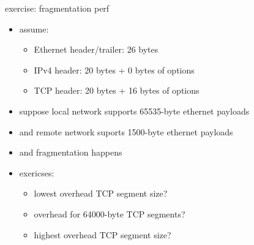 \begin{frame}{exercise: fragmentation perf}
    \begin{itemize}
    \item assume:
    \begin{itemize}
        \item Ethernet header/trailer: 26 bytes
        \item IPv4 header: 20 bytes + 0 bytes of options
        \item TCP header: 20 bytes + 16 bytes of options
    \end{itemize}
    \vspace{.5cm}
    \item suppose local network supports 65535-byte ethernet payloads
    \item and remote network suports 1500-byte ethernet payloads
    \item and fragmentation happens
    \item exericses:
        \begin{itemize}
        \item lowest overhead TCP segment size?
        \item overhead for 64000-byte TCP segments?
        \item highest overhead TCP segment size?
        \end{itemize}
    \end{itemize}
\end{frame}
